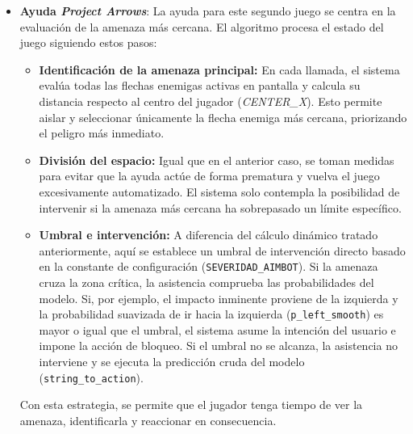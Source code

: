\begin{itemize}
    \item \textbf{Ayuda \textit{Project Arrows}}: La ayuda para este segundo juego se centra en la evaluación de la amenaza más cercana. El algoritmo procesa el estado del juego siguiendo estos pasos:
    \begin{itemize}
        \item \textbf{Identificación de la amenaza principal:} En cada llamada, el sistema evalúa todas las flechas enemigas activas en pantalla y calcula su distancia respecto al centro del jugador (\textit{CENTER\_X}). Esto permite aislar y seleccionar únicamente la flecha enemiga más cercana, priorizando el peligro más inmediato.
        \item \textbf{División del espacio:} Igual que en el anterior caso, se toman medidas para evitar que la ayuda actúe de forma prematura y vuelva el juego excesivamente automatizado. El sistema solo contempla la posibilidad de intervenir si la amenaza más cercana ha sobrepasado un límite específico.
        \item \textbf{Umbral e intervención:} A diferencia del cálculo dinámico tratado anteriormente, aquí se establece un umbral de intervención directo basado en la constante de configuración (\texttt{SEVERIDAD\_AIMBOT}). Si la amenaza cruza la zona crítica, la asistencia comprueba las probabilidades del modelo. Si, por ejemplo, el impacto inminente proviene de la izquierda y la probabilidad suavizada de ir hacia la izquierda (\texttt{p\_left\_smooth}) es mayor o igual que el umbral, el sistema asume la intención del usuario e impone la acción de bloqueo. Si el umbral no se alcanza, la asistencia no interviene y se ejecuta la predicción cruda del modelo (\texttt{string\_to\_action}).
    \end{itemize}
    Con esta estrategia, se permite que el jugador tenga tiempo de ver la amenaza, identificarla y reaccionar en consecuencia.
\end{itemize}
